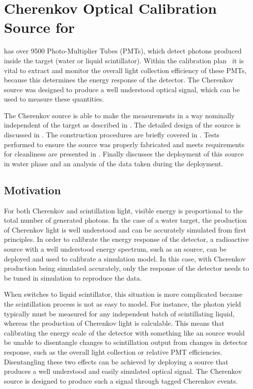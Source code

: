 \renewcommand{\bf}{\bfseries}

\chapter{Cherenkov Optical Calibration Source for \texorpdfstring{\snop}{SNO+}}
\label{ch:chsrc}

{\snop} has over 9500 Photo-Multiplier Tubes (PMTs), which detect photons produced inside the target (water or liquid scintillator).
Within the {\snop} calibration plan~\cite{gann:2013} it is vital to extract and monitor the overall light collection efficiency of these PMTs, because this determines the energy response of the detector.
The Cherenkov source was designed to produce a well understood optical signal, which can be used to measure these quantities.

The Cherenkov source is able to make the measurements in a way nominally independent of the target as described in . 
The detailed design of the source is discussed in . 
The construction procedures are briefly covered in .
Tests performed to ensure the source was properly fabricated and meets {\snop} requirements for cleanliness are presented in .
Finally  discusses the deployment of this source in {\snop} water phase and an analysis of the data taken during the deployment.

\section{Motivation}
\label{chap:motivation}

For both Cherenkov and scintillation light, visible energy is proportional to the total number of generated photons.
In the case of a water target, the production of Cherenkov light is well understood and can be accurately simulated from first principles.
In order to calibrate the energy response of the detector, a radioactive source with a well understood energy spectrum, such as an \N source, can be deployed and used to calibrate a simulation model.
In this case, with Cherenkov production being simulated accurately, only the response of the detector needs to be tuned in simulation to reproduce the data.

When {\snop} switches to liquid scintillator, this situation is more complicated because the scintillation process is not as easy to model.
For instance, the photon yield typically must be measured for any independent batch of scintillating liquid, whereas the production of Cherenkov light is calculable. 
This means that calibrating the energy scale of the detector with something like an \N source would be unable to disentangle changes to scintillation output from changes in detector response, such as the overall light collection or relative PMT efficiencies.
Disentangling these two effects can be achieved by deploying a source that produces a well understood and easily simulated optical signal. 
The Cherenkov source is designed to produce such a signal through tagged Cherenkov events.


